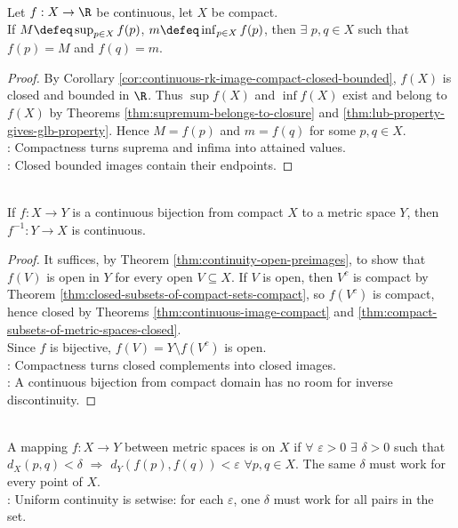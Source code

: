 \begin{theorem} \label{thm:extreme-value-theorem-compact} \\
Let $f:X\to\R$ be continuous, let $X$ be compact.\\
If $M\defeq\sup_{p\in X}f(p)$, $m\defeq\inf_{p\in X}f(p)$, then $\exists$ $p,q\in X$ such that $f(p)=M$ and $f(q)=m$.
\begin{proof}
By Corollary \ref{cor:continuous-rk-image-compact-closed-bounded}, $f(X)$ is closed and bounded in $\R$. Thus $\sup f(X)$ and $\inf f(X)$ exist and belong to $f(X)$ by Theorems \ref{thm:supremum-belongs-to-closure} and \ref{thm:lub-property-gives-glb-property}. Hence $M=f(p)$ and $m=f(q)$ for some $p,q\in X$.\\
: Compactness turns suprema and infima into attained values.\\
: Closed bounded images contain their endpoints.
\end{proof}
\end{theorem}

\begin{theorem} \label{thm:compact-bijection-has-continuous-inverse} \\
If $f:X\to Y$ is a continuous bijection from compact $X$ to a metric space $Y$, then $f^{-1}:Y\to X$ is continuous.
\begin{proof}
It suffices, by Theorem \ref{thm:continuity-open-preimages}, to show that $f(V)$ is open in $Y$ for every open $V\subseteq X$. If $V$ is open, then $V^c$ is compact by Theorem \ref{thm:closed-subsets-of-compact-sets-compact}, so $f(V^c)$ is compact, hence closed by Theorems \ref{thm:continuous-image-compact} and \ref{thm:compact-subsets-of-metric-spaces-closed}.\\
Since $f$ is bijective, $f(V)=Y\setminus f(V^c)$ is open.\\
: Compactness turns closed complements into closed images.\\
: A continuous bijection from compact domain has no room for inverse discontinuity.
\end{proof}
\end{theorem}

\begin{definition} \label{def:uniform-continuity} \\
A mapping $f:X\to Y$ between metric spaces is  on $X$ if $\forall$ $\varepsilon>0$ $\exists$ $\delta>0$ such that $d_X(p,q)<\delta$ $\Longrightarrow$ $d_Y(f(p),f(q))<\varepsilon$ $\forall p,q\in X$. The same $\delta$ must work for every point of $X$.\\
: Uniform continuity is setwise: for each $\varepsilon$, one $\delta$ must work for all pairs in the set.
\end{definition}

